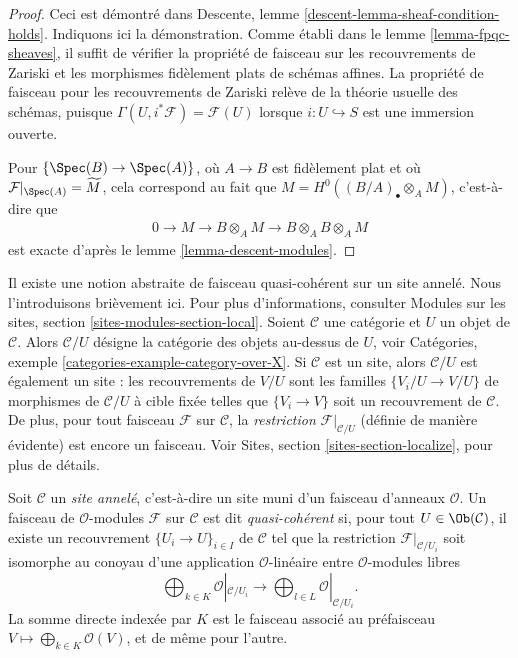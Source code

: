 \begin{proof}
Ceci est d\'emontr\'e dans
Descente, lemme \ref{descent-lemma-sheaf-condition-holds}.
Indiquons ici la d\'emonstration. Comme \'etabli dans le
lemme \ref{lemma-fpqc-sheaves},
il suffit de v\'erifier la propri\'et\'e de faisceau
sur les recouvrements de Zariski et les morphismes fid\`element plats de sch\'emas affines. La
propri\'et\'e de faisceau pour les recouvrements de Zariski rel\`eve de la th\'eorie usuelle des sch\'emas, puisque
$\Gamma(U, i^\ast \mathcal{F}) = \mathcal{F}(U)$ lorsque
$i : U \hookrightarrow S$ est une immersion ouverte.

\medskip\noindent
Pour $\left\{\Spec(B)\to \Spec(A)\right\}$, o\`u $A\to B$ est fid\`element
plat et o\`u
$\mathcal{F}|_{\Spec(A)} = \widetilde{M}$,
cela correspond au fait que
$M = H^0\left((B/A)_\bullet \otimes_A M \right)$, c'est-\`a-dire que
\begin{align*}
0 \to M \to B \otimes_A M \to B \otimes_A B \otimes_A M
\end{align*}
est exacte d'apr\`es le
lemme \ref{lemma-descent-modules}.
\end{proof}

\noindent
Il existe une notion abstraite de faisceau quasi-coh\'erent sur un site annel\'e.
Nous l'introduisons bri\`evement ici. Pour plus d'informations, consulter
Modules sur les sites, section \ref{sites-modules-section-local}.
Soient $\mathcal{C}$ une cat\'egorie et $U$ un objet de $\mathcal{C}$.
Alors $\mathcal{C}/U$ d\'esigne la cat\'egorie des objets au-dessus de $U$, voir
Cat\'egories, exemple \ref{categories-example-category-over-X}.
Si $\mathcal{C}$ est un site, alors $\mathcal{C}/U$ est \'egalement un site :
les recouvrements de $V/U$ sont les familles $\{V_i/U \to V/U\}$ de morphismes
de $\mathcal{C}/U$ \`a cible fix\'ee telles que
$\{V_i \to V\}$ soit un recouvrement de $\mathcal{C}$. De plus, pour tout
faisceau $\mathcal{F}$ sur $\mathcal{C}$, la {\it restriction}
$\mathcal{F}|_{\mathcal{C}/U}$ (d\'efinie de mani\`ere \'evidente)
est encore un faisceau. Voir
Sites, section \ref{sites-section-localize},
pour plus de d\'etails.

\begin{definition}
\label{definition-ringed-site}
Soit $\mathcal{C}$ un {\it site annel\'e}, c'est-\`a-dire un site muni d'un
faisceau d'anneaux $\mathcal{O}$. Un faisceau de $\mathcal{O}$-modules $\mathcal{F}$ sur
$\mathcal{C}$ est dit {\it quasi-coh\'erent} si, pour tout
$U \in \Ob(\mathcal{C})$, il existe un recouvrement
$\{U_i \to U\}_{i\in I}$ de $\mathcal{C}$ tel que la restriction
$\mathcal{F}|_{\mathcal{C}/U_i}$ soit isomorphe au conoyau d'une
application $\mathcal{O}$-lin\'eaire entre $\mathcal{O}$-modules libres
$$
\bigoplus\nolimits_{k \in K} \mathcal{O}|_{\mathcal{C}/U_i}
\longrightarrow
\bigoplus\nolimits_{l \in L} \mathcal{O}|_{\mathcal{C}/U_i}.
$$
La somme directe index\'ee par $K$ est le faisceau associ\'e au pr\'efaisceau
$V \mapsto \bigoplus_{k \in K} \mathcal{O}(V)$, et de m\^eme pour l'autre.
\end{definition}

